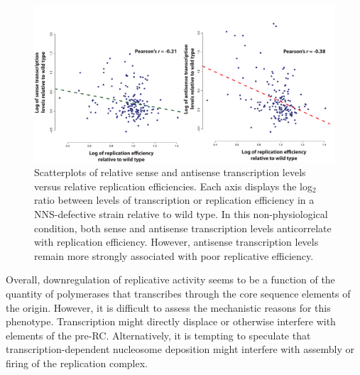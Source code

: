 \begin{figure}[h]

\centering
\includegraphics[width=\textwidth]{figures/results/JScorrelations}
\caption[Correlations between transcription and replication efficiency in a NNS defective strain]{Scatterplots of relative sense and antisense transcription levels versus relative replication efficiencies. Each axis displays the log$_2$ ratio between levels of transcription or replication efficiency in a NNS-defective strain relative to wild type. In this non-physiological condition, both sense and antisense transcription levels anticorrelate with replication efficiency. However, antisense transcription levels remain more strongly associated with poor replicative efficiency.}
\label{fig:JS}

\end{figure} 


Overall, downregulation of replicative activity seems to be a function of the quantity of polymerases that transcribes through the core sequence elements of the origin. 
However, it is difficult to assess the mechanistic reasons for this phenotype. 
Transcription might directly displace or otherwise interfere with elements of the pre-RC. 
Alternatively, it is tempting to speculate that transcription-dependent nucleosome deposition might interfere with assembly or firing of the replication complex.

\clearpage
